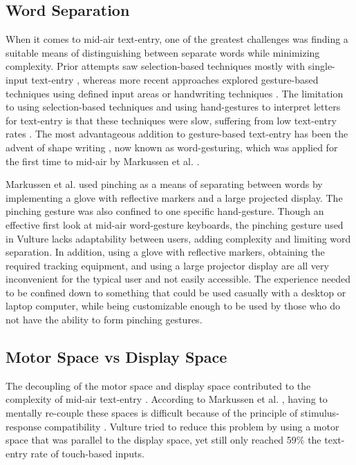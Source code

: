 \subsection{Word Separation}
When it comes to mid-air text-entry, one of the greatest challenges was finding a suitable means of distinguishing between separate words while minimizing complexity. Prior attempts saw selection-based techniques mostly with single-input text-entry \cite{ref_selection_based_mid_air,ref_mid_air_text_large_displays}, whereas more recent approaches explored gesture-based techniques \cite{ref_airstroke,ref_graffiti_vs_unistroke,ref_continuous_recognition} using defined input areas or handwriting techniques \cite{ref_air_handwriting,ref_air_writing_continuous_recognition,ref_mid_air_text_entry_handwriting,ref_detecting_handwritten_characters}. The limitation to using selection-based techniques and using hand-gestures to interpret letters for text-entry is that these techniques were slow, suffering from low text-entry rates \cite{ref_selection_based_mid_air,ref_mid_air_text_large_displays}. The most advantageous addition to gesture-based text-entry has been the advent of shape writing \cite{ref_shape_writing,ref_the_word_gesture_keyboard,ref_shapewriter_iphone,ref_shark_wgk,ref_shorthand_writing}, now known as word-gesturing, which was applied for the first time to mid-air by Markussen et al. \citeyear{ref_vulture}.

Markussen et al. \citeyear{ref_vulture} used pinching as a means of separating between words by implementing a glove with reflective markers and a large projected display. The pinching gesture was also confined to one specific hand-gesture. Though an effective first look at mid-air word-gesture keyboards, the pinching gesture used in Vulture lacks adaptability between users, adding complexity and limiting word separation. In addition, using a glove with reflective markers, obtaining the required tracking equipment, and using a large projector display are all very inconvenient for the typical user and not easily accessible. The experience needed to be confined down to something that could be used casually with a desktop or laptop computer, while being customizable enough to be used by those who do not have the ability to form pinching gestures.

\subsection{Motor Space vs Display Space}
The decoupling of the motor space and display space contributed to the complexity of mid-air text-entry \cite{ref_vulture}. According to Markussen et al. \citeyear{ref_vulture}, having to mentally re-couple these spaces is difficult because of the principle of stimulus-response compatibility \cite{ref_stimulus_response_compatibility}. Vulture tried to reduce this problem by using a motor space that was parallel to the display space, yet still only reached 59\% the text-entry rate of touch-based inputs.

